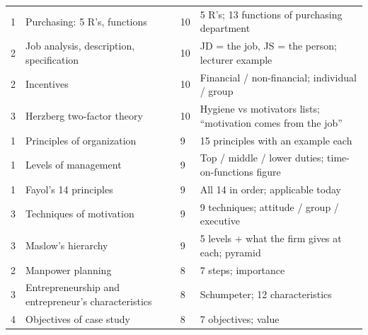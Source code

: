 {\begin{tabularx}{\textwidth}{@{}L{0.6cm}L{6.4cm}L{1.1cm}X@{}}
1 & Purchasing: 5 R's, functions & 10 & 5 R's; 13 functions of purchasing department \\
2 & Job analysis, description, specification & 10 & JD = the job, JS = the person; lecturer example \\
2 & Incentives & 10 & Financial / non-financial; individual / group \\
3 & Herzberg two-factor theory & 10 & Hygiene vs motivators lists; ``motivation comes from the job'' \\
1 & Principles of organization & 9 & 15 principles with an example each \\
1 & Levels of management & 9 & Top / middle / lower duties; time-on-functions figure \\
1 & Fayol's 14 principles & 9 & All 14 in order; applicable today \\
3 & Techniques of motivation & 9 & 9 techniques; attitude / group / executive \\
3 & Maslow's hierarchy & 9 & 5 levels + what the firm gives at each; pyramid \\
2 & Manpower planning & 8 & 7 steps; importance \\
3 & Entrepreneurship and entrepreneur's characteristics & 8 & Schumpeter; 12 characteristics \\
4 & Objectives of case study & 8 & 7 objectives; value \\
\bottomrule
\end{tabularx}}

\par{}\vspace{4pt}


